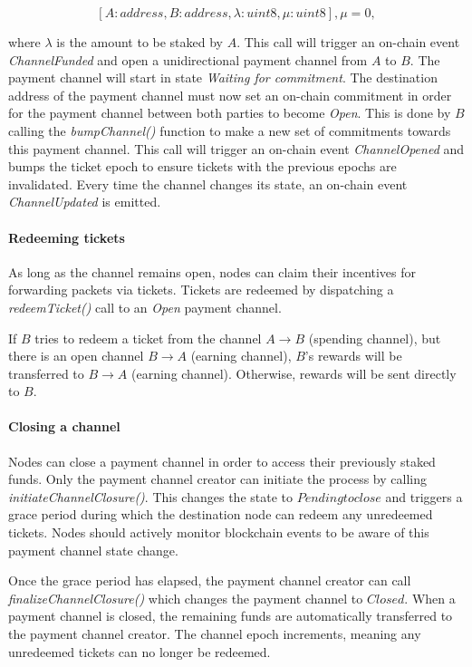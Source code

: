 $$[A: address, B: address, \lambda: uint8, \mu: uint8], \mu = 0,$$

where $\lambda$ is the amount to be staked by $A$. This call will trigger an on-chain event \textit{ChannelFunded} and open a unidirectional payment channel from $A$ to $B$. The payment channel will start in state \textit{Waiting for commitment}. The destination address of the payment channel must now set an on-chain commitment in order for the payment channel between both parties to become \textit{Open}. This is done by $B$ calling the \textit{bumpChannel()} function to make a new set of commitments towards this payment channel. This call will trigger an on-chain event \textit{ChannelOpened} and bumps the ticket epoch to ensure tickets with the previous epochs are invalidated. Every time the channel changes its state, an on-chain event \textit{ChannelUpdated} is emitted.

\paragraph{Redeeming tickets}
As long as the channel remains open, nodes can claim their incentives for forwarding packets via tickets. Tickets are redeemed by dispatching a \textit{redeemTicket()} call to an \textit{Open} payment channel.

If $B$ tries to redeem a ticket from the channel $A\rightarrow B$ (spending channel), but there is an open channel $B\rightarrow A$ (earning channel), $B$'s rewards will be transferred to $B\rightarrow A$ (earning channel). Otherwise, rewards will be sent directly to $B$.

\paragraph{Closing a channel}
Nodes can close a payment channel in order to access their previously staked funds. Only the payment channel creator can initiate the process by calling \textit{initiateChannelClosure()}. This changes the state to $Pending to close$ and triggers a grace period during which the destination node can redeem any unredeemed tickets. Nodes should actively monitor blockchain events to be aware of this payment channel state change.

Once the grace period has elapsed, the payment channel creator can call \textit{finalizeChannelClosure()} which changes the payment channel to $Closed$. When a payment channel is closed, the remaining funds are automatically transferred to the payment channel creator. The channel epoch increments, meaning any unredeemed tickets can no longer be redeemed.
